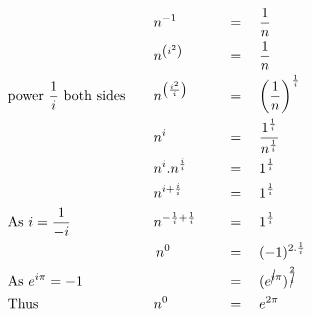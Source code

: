 \begin{alignat*}{5}
&\,&&n^{-1}&&\,\quad=\quad\frac{1}{n}\\
&\,&&n^{\left(i^2\right)}&&\,\quad=\quad\frac{1}{n}\\
&\mathrm{power}~\frac{1}{i}~\mathrm{both~sides}\quad&&n^{\left(\frac{i^2}{i}\right)} &&\,\quad=\quad\left(\frac{1}{n}\right)^\frac{1}{i}\\
&\,&&n^i&&\,\quad=\quad\frac{1^\frac{1}{i}}{n^\frac{1}{i}}\\
&\,&&n^i.n^\frac{i}{i}&&\,\quad=\quad1^\frac{1}{i}\\
&\,&&n^{i+\frac{i}{i}}&&\,\quad=\quad1^\frac{1}{i}\\
&\mathrm{As}~i=\frac{1}{-i}&&n^{-\frac{1}{i}+\frac{1}{i}}&&\,\quad=\quad1^\frac{1}{i}\\
&\,&&\,n^0&&\,\quad=\quad(-1)^{2.\frac{1}{i}}\\
&\mathrm{As}~e^{i\pi}=-1&&\,&&\,\quad=\quad(e^{\cancel{i}\pi})^\frac{2}{\cancel{i}}\\
&\mathrm{Thus}&&n^0&&\,\quad=\quad e^{2\pi}\\
\end{alignat*}
